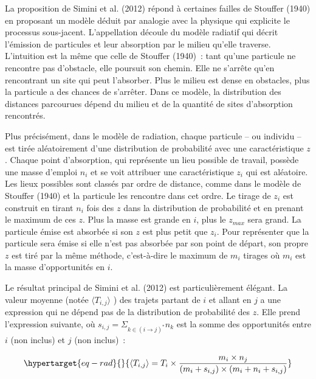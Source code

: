 \documentclass[
  10pt,
  a4paper,
  numbers=noendperiod,
  DIV=9]{scrreprt}
\begin{document}
La proposition de Simini et al. (2012) répond à certaines failles de
Stouffer (1940) en proposant un modèle déduit par analogie avec la
physique qui explicite le processus sous-jacent. L'appellation découle
du modèle radiatif qui décrit l'émission de particules et leur
absorption par le milieu qu'elle traverse. L'intuition est la même que
celle de Stouffer (1940)~: tant qu'une particule ne rencontre pas
d'obstacle, elle poursuit son chemin. Elle ne s'arrête qu'en rencontrant
un site qui peut l'absorber. Plus le milieu est dense en obstacles, plus
la particule a des chances de s'arrêter. Dans ce modèle, la distribution
des distances parcourues dépend du milieu et de la quantité de sites
d'absorption rencontrés.

Plus précisément, dans le modèle de radiation, chaque particule -- ou
individu -- est tirée aléatoirement d'une distribution de probabilité
avec une caractéristique \(z\). Chaque point d'absorption, qui
représente un lieu possible de travail, possède une masse d'emploi
\(n_i\) et se voit attribuer une caractéristique \(z_i\) qui est
aléatoire. Les lieux possibles sont classés par ordre de distance, comme
dans le modèle de Stouffer (1940) et la particule les rencontre dans cet
ordre. Le tirage de \(z_i\) est construit en tirant \(n_i\) fois des
\(z\) dans la distribution de probabilité et en prenant le maximum de
ces \(z\). Plus la masse est grande en \(i\), plus le \(z_{max}\) sera
grand. La particule émise est absorbée si son \(z\) est plus petit que
\(z_i\). Pour représenter que la particule sera émise si elle n'est pas
absorbée par son point de départ, son propre \(z\) est tiré par la même
méthode, c'est-à-dire le maximum de \(m_i\) tirages où \(m_i\) est la
masse d'opportunités en \(i\).

Le résultat principal de Simini et al. (2012) est particulièrement
élégant. La valeur moyenne (notée \(\langle T_{i,j}\rangle\) ) des
trajets partant de \(i\) et allant en \(j\) a une expression qui ne
dépend pas de la distribution de probabilité des \(z\). Elle prend
l'expression suivante, où
\(s_{i,j}=\Sigma_{k \in (i \rightarrow j)^*} n_k\) est la somme des
opportunités entre \(i\) (non inclus) et \(j\) (non inclus)~:

\begin{equation}\protect\hypertarget{eq-rad}{}{
\langle T_{i,j}\rangle = T_i \times \frac {m_i \times n_j}{(m_i + s_{i,j}) \times (m_i + n_i +s_{i,j})}
}\label{eq-rad}\end{equation}
\end{document}
